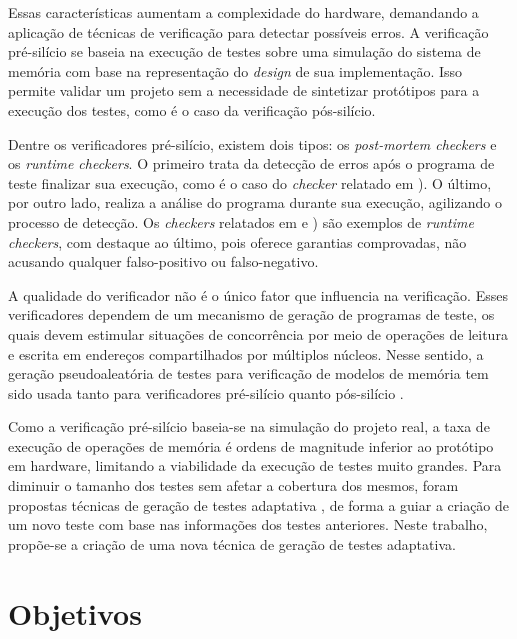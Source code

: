 \documentclass{ufsc-thesis} %
\begin{document}
Essas características aumentam a complexidade do hardware, demandando a
aplicação de técnicas de verificação para detectar possíveis erros. A
verificação pré-silício se baseia na execução de testes sobre uma simulação do
sistema de memória com base na representação do \textit{design} de sua
implementação. Isso permite validar um projeto sem a necessidade de sintetizar
protótipos para a execução dos testes, como é o caso da verificação
pós-silício.

Dentre os verificadores pré-silício, existem dois tipos: os \textit{post-mortem
checkers} e os \textit{runtime checkers}. O primeiro trata da detecção de erros
após o programa de teste finalizar sua execução, como é o caso do
\textit{checker} relatado em ).  O último, por outro
lado, realiza a análise do programa durante sua execução, agilizando o processo
de detecção. Os \textit{checkers} relatados em  e
) são exemplos de \textit{runtime checkers}, com
destaque ao último, pois oferece garantias comprovadas, não acusando qualquer
falso-positivo ou falso-negativo.

A qualidade do verificador não é o único fator que influencia na verificação.
Esses verificadores dependem de um mecanismo de geração de programas de teste,
os quais devem estimular situações de concorrência por meio de operações de
leitura e escrita em endereços compartilhados por múltiplos núcleos. Nesse
sentido, a geração pseudoaleatória de testes para verificação de modelos de
memória tem sido usada tanto para verificadores pré-silício \cite{Shacham:2008,
Freitas:2013} quanto pós-silício \cite{Hangal:2004, Manovit:2006:c,
Roy:2006,Hu:2012}.

Como a verificação pré-silício baseia-se na simulação do projeto real, a taxa
de execução de operações de memória é ordens de magnitude inferior ao protótipo
em hardware, limitando a viabilidade da execução de testes muito grandes. Para
diminuir o tamanho dos testes sem afetar a cobertura dos mesmos, foram
propostas técnicas de geração de testes adaptativa \cite{Wagner:2008m,
Elver:2016}, de forma a guiar a criação de um novo teste com base nas
informações dos testes anteriores. Neste trabalho, propõe-se a criação de uma
nova técnica de geração de testes adaptativa.

\chapter{Objetivos}
\end{document}
